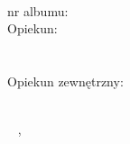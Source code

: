 {\large \bfseries \authornames}\\[.5cm]
{nr albumu: \bfseries {\noalbum}}\\[1cm]


{\large  Opiekun:}\\[.5cm]
{\large \bfseries{\supname}}\\[.5cm]
{\departmentname}\\[1cm]


\ifdefined\supExt
    {\large Opiekun zewnętrzny:}\\[.5cm]
    {\large \bfseries{\supExt}}\\[.5cm]
    \departmentnameExt
\fi

~\vfill
\placesubmit, \yearsubmit\\

\endgroup

